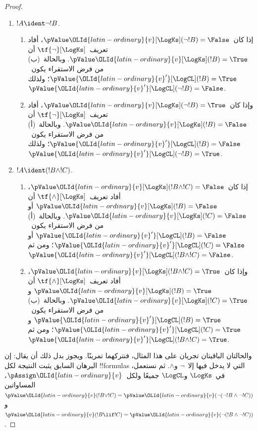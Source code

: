 \documentclass[../../../include/open-logic-section]{subfiles}
\begin{document}
\begin{proof}
\begin{enumerate}
    وأما خطوة الاستقراء فتفصل إلى الحالات الآتية:
    \item $!A \ident \lnot !B$.
    \begin{enumerate}
      \item إذا كان~$\pValue \OLId{latin-ordinary}{v}[\LogKs](\lnot!B) = \False$، أفاد
      تعريف~$\tf{\lnot}[\LogKs]$ أن
      $\pValue \OLId{latin-ordinary}{v}[\LogKs](!B) = \True$. وبالحالة~(ب) من فرض
      الاستقراء يكون~$\pValue {\OLId{latin-ordinary}{v}'}[\LogCL](!B) = \True$؛ ولذلك
      $\pValue {\OLId{latin-ordinary}{v}'}[\LogCL](\lnot !B) = \False$.
      \item وإذا كان~$\pValue \OLId{latin-ordinary}{v}[\LogKs](\lnot!B) = \True$، أفاد
      تعريف~$\tf{\lnot}[\LogKs]$ أن
      $\pValue \OLId{latin-ordinary}{v}[\LogKs](!B) = \False$. وبالحالة~(أ) من فرض
      الاستقراء يكون~$\pValue {\OLId{latin-ordinary}{v}'}[\LogCL](!B) = \False$؛ ولذلك
      $\pValue {\OLId{latin-ordinary}{v}'}[\LogCL](\lnot !B) = \True$.
    \end{enumerate}

    \item $!A \ident (!B \land !C)$.
    \begin{enumerate}
      \item إذا كان~$\pValue \OLId{latin-ordinary}{v}[\LogKs](!B \land !C) = \False$،
      أفاد تعريف~$\tf{\land}[\LogKs]$ أن
      $\pValue \OLId{latin-ordinary}{v}[\LogKs](!B) = \False$ أو
      $\pValue \OLId{latin-ordinary}{v}[\LogKs](!C) = \False$. وبالحالة~(أ) من فرض
      الاستقراء يكون~$\pValue {\OLId{latin-ordinary}{v}'}[\LogCL](!B) = \False$ أو
      $\pValue {\OLId{latin-ordinary}{v}'}[\LogCL](!C) = \False$؛ ومن ثم
      $\pValue {\OLId{latin-ordinary}{v}'}[\LogCL](!B \land !C) = \False$.
      \item وإذا كان~$\pValue \OLId{latin-ordinary}{v}[\LogKs](!B \land !C) = \True$،
      أفاد تعريف~$\tf{\land}[\LogKs]$ أن
      $\pValue \OLId{latin-ordinary}{v}[\LogKs](!B) = \True$ و
      $\pValue \OLId{latin-ordinary}{v}[\LogKs](!C) = \True$. وبالحالة~(ب) من فرض
      الاستقراء يكون~$\pValue {\OLId{latin-ordinary}{v}'}[\LogCL](!B) = \True$ و
      $\pValue {\OLId{latin-ordinary}{v}'}[\LogCL](!C) = \True$؛ ومن ثم
      $\pValue {\OLId{latin-ordinary}{v}'}[\LogCL](!B \land !C) = \True$.
    \end{enumerate}
  \end{enumerate}

  والحالتان الباقيتان تجريان على هذا المثال، فنتركهما تمرينًا.
  ويجوز بدل ذلك أن يقال: إن البرهان السابق يثبت النتيجة لكل
  !!{formula}s التي لا يدخل فيها إلا~$\lnot$ و$\land$. ثم نستعمل،
  في~$\LogKs$ و$\LogCL$ جميعًا ولكل~$\pAssign \OLId{latin-ordinary}{v}$، المساواتين
  $\pValue \OLId{latin-ordinary}{v}(!B \lor !C) = \pValue \OLId{latin-ordinary}{v}(\lnot(\lnot!B \land \lnot !C))$
  و$\pValue \OLId{latin-ordinary}{v}(!B \lif !C) = \pValue \OLId{latin-ordinary}{v}(\lnot(!B \land \lnot !C))$.
\end{proof}
\end{document}
